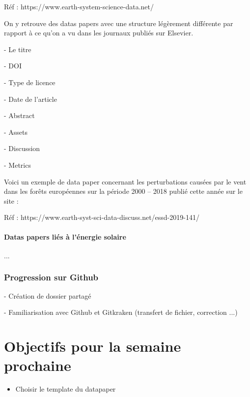 \documentclass[11pt,oneside]{article}
\begin{document}
Réf : https://www.earth-system-science-data.net/

On y retrouve des datas papers avec une structure légèrement différente par rapport à ce qu’on a vu dans les journaux publiés sur Elsevier.

-	Le titre

-	DOI

-	Type de licence

-	Date de l’article

-	Abstract

-	Assets

-	Discussion

-	Metrics

Voici un exemple de data paper concernant les perturbations causées par le vent dans les forêts européennes sur la période 2000 – 2018 publié cette année sur le site :

Réf : https://www.earth-syst-sci-data-discuss.net/essd-2019-141/


\subsection{Datas papers liés à l'énergie solaire}

...

\section{Progression sur Github}
- Création de dossier partagé

- Familiarisation avec Github et Gitkraken (transfert de fichier, correction ...)


\newpage
\part{Objectifs pour la semaine prochaine}
\begin{itemize}
	\item Choisir le template du datapaper
	

\end{itemize}
\end{document}
